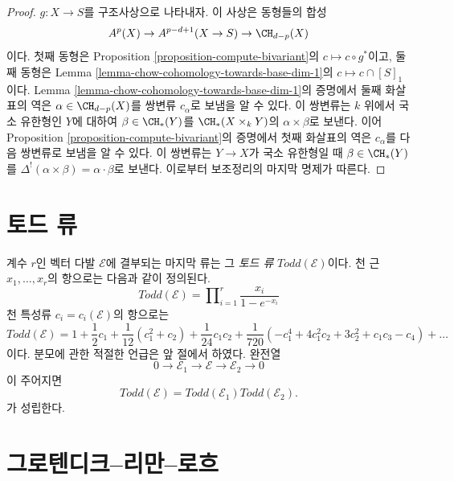 \begin{proof}
$g : X \to S$를 구조사상으로 나타내자. 이 사상은 동형들의 합성
$$
A^p(X) \to A^{p - d + 1}(X \to S) \to \CH_{d - p}(X)
$$
이다. 첫째 동형은 Proposition \ref{proposition-compute-bivariant}의
$c \mapsto c \circ g^*$이고, 둘째 동형은 Lemma
\ref{lemma-chow-cohomology-towards-base-dim-1}의
$c \mapsto c \cap [S]_1$이다. Lemma
\ref{lemma-chow-cohomology-towards-base-dim-1}의 증명에서 둘째
화살표의 역은 $\alpha \in \CH_{d - p}(X)$를 쌍변류 $c_\alpha$로
보냄을 알 수 있다. 이 쌍변류는 $k$ 위에서 국소 유한형인 $Y$에
대하여 $\beta \in \CH_*(Y)$를
$\CH_*(X \times_k Y)$의 $\alpha \times \beta$로 보낸다. 이어
Proposition \ref{proposition-compute-bivariant}의 증명에서 첫째
화살표의 역은 $c_\alpha$를 다음 쌍변류로 보냄을 알 수 있다.
이 쌍변류는 $Y \to X$가 국소 유한형일 때
$\beta \in \CH_*(Y)$를
$\Delta^!(\alpha \times \beta) = \alpha \cdot \beta$로 보낸다.
이로부터 보조정리의 마지막 명제가 따른다.
\end{proof}










\section{토드 류}
\label{section-todd-classes}

\noindent
계수 $r$인 벡터 다발 $\mathcal{E}$에 결부되는 마지막 류는 그
{\it 토드 류} $Todd(\mathcal{E})$이다. 천 근
$x_1, \ldots, x_r$의 항으로는 다음과 같이 정의된다.
$$
Todd(\mathcal{E})
=
\prod\nolimits_{i = 1}^r
\frac{x_i}{1 - e^{-x_i}}
$$
천 특성류 $c_i = c_i(\mathcal{E})$의 항으로는
$$
Todd(\mathcal{E})
=
1
+
\frac{1}{2}c_1
+
\frac{1}{12}(c_1^2 + c_2)
+
\frac{1}{24}c_1c_2
+
\frac{1}{720}(-c_1^4 + 4c_1^2c_2 + 3c_2^2 + c_1c_3 - c_4)
+
\ldots
$$
이다. 분모에 관한 적절한 언급은 앞 절에서 하였다. 완전열
$$
0
\to
{\mathcal E}_1
\to
{\mathcal E}
\to
{\mathcal E}_2
\to
0
$$
이 주어지면
$$
Todd({\mathcal E}) = Todd({\mathcal E}_1) Todd({\mathcal E}_2).
$$
가 성립한다.






\section{그로텐디크--리만--로흐}
\label{section-grr}

